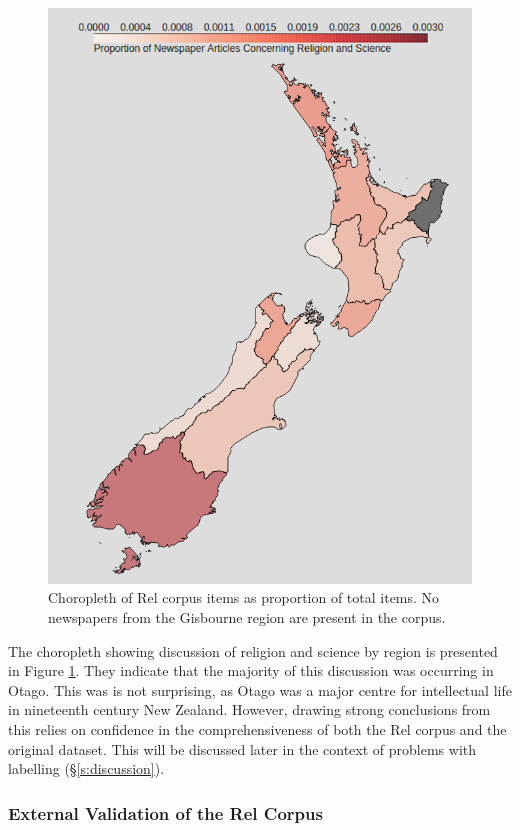 \documentclass{article}
\begin{document}
\begin{figure}
    \centering
    \includegraphics[width=\textwidth]{images/choropleth.png}
    \caption{Choropleth of Rel corpus items as proportion of total items. No newspapers from the Gisbourne region are present in the corpus.}
    \label{f:choropleth}
\end{figure}

The choropleth showing discussion of religion and science by region is presented in Figure \ref{f:choropleth}. They indicate that the majority of this discussion was occurring in Otago. This was is not surprising, as Otago was a major centre for intellectual life in nineteenth century New Zealand. However, drawing strong conclusions from this relies on confidence in the comprehensiveness of both the Rel corpus and the original dataset. This will be discussed later  in the context of problems with labelling (\S \ref{s:discussion}).

\subsubsection{External Validation of the Rel Corpus}\label{s:external-validation}
\end{document}
